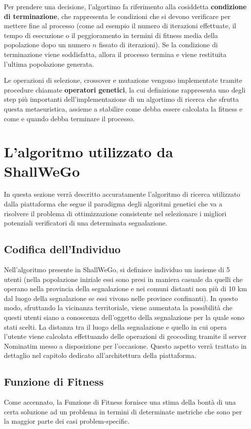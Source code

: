     Per prendere una decisione, l'algortimo fa riferimento alla cosiddetta \textbf{condizione di terminazione}, che rappresenta le condizioni che si devono verificare per mettere fine al processo (come ad esempio il numero di iterazioni effettuate, il tempo di esecuzione o il peggioramento in termini di fitness media della popolazione dopo un numero $n$ fissato di iterazioni). Se la condizione di terminazione viene soddisfatta, allora il processo termina e viene restituita l'ultima popolazione generata.

    Le operazioni di selezione, crossover e mutazione vengono implementate tramite procedure chiamate \textbf{operatori genetici}, la cui definizione rappresenta uno degli step più importanti dell'implementazione di un algortimo di ricerca che sfrutta questa metaeuristica, assieme a stabilire come debba essere calcolata la fitness e come e quando debba terminare il processo. 

\section{L'algoritmo utilizzato da ShallWeGo}
    In questa sezione verrà descritto accuratamente l'algoritmo di ricerca utilizzato dalla piattaforma che segue il paradigma degli algoritmi genetici che va a risolvere il problema di ottimizzazione consistente nel selezionare i migliori potenziali verificatori di una determinata segnalazione.

\subsection{Codifica dell'Individuo}
    Nell'algoritmo presente in ShallWeGo, si definisce individuo un insieme di 5 utenti (nella popolazione iniziale essi sono presi in maniera casuale da quelli che operano nella provincia della segnalazione e nei comuni distanti non più di 10 km dal luogo della segnalazione se essi vivono nelle province confinanti). In questo modo, sfruttando la vicinanza territoriale, viene aumentata la possibilità che questi utenti siano a conoscenza dell'oggetto della segnalazione per la quale sono stati scelti. La distanza tra il luogo della segnalazione e quello in cui opera l'utente viene calcolata effettuando delle operazioni di geocoding tramite il server Nominatim messo a disposizione per l'occasione. Questo aspetto verrà trattato in dettaglio nel capitolo dedicato all'architettura della piattaforma.

\subsection{Funzione di Fitness}
    Come accennato, la Funzione di Fitness fornisce una stima della bontà di una certa soluzione ad un problema in termini di determinate metriche che sono per la maggior parte dei casi problem-specific.

